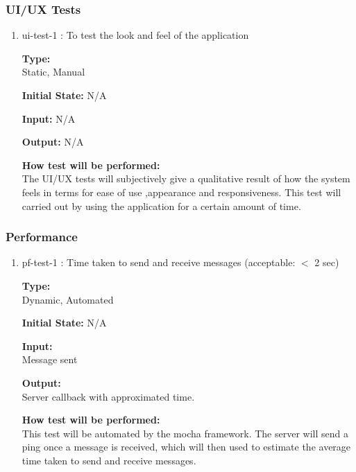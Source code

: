 \documentclass[12pt, titlepage]{article}
\begin{document}
\subsubsection{UI/UX Tests}
\begin{enumerate}
\item{ui-test-1 : To test the look and feel of the application\\}

\textbf{Type:}\\ Static, Manual
					
\textbf{Initial State:} N/A
					
\textbf{Input:} N/A
					
\textbf{Output:} N/A
					
\textbf{How test will be performed:}\\ 
The UI/UX tests will subjectively give a qualitative result of how the system feels in terms for ease of use ,appearance and responsiveness. This test will carried out by using the application for a certain amount of time.
\end{enumerate}


\subsubsection{Performance}
\begin{enumerate}
\item{pf-test-1 : Time taken to send and receive messages (acceptable: $<$ 2 sec)\\}

\textbf{Type:}\\ Dynamic, Automated
					
\textbf{Initial State:} N/A
					
\textbf{Input:}\\ Message sent
					
\textbf{Output:}\\ Server callback with approximated time.
					
\textbf{How test will be performed:}\\ 
This test will be automated by the mocha framework. The server will send a ping once a message is received, which will then used to estimate the average time taken to send and receive messages.
\end{enumerate}
\end{document}
